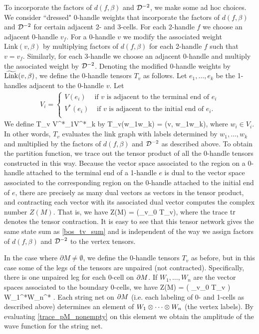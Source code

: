 To incorporate the factors of $d(f, \beta)$ and $\mathcal{D}^{-2}$, we make some ad hoc choices.
We consider ``dressed" 
0-handle weights that incorporate the factors of $d(f,\beta)$ and $\mathcal{D}^{-2}$ for certain adjacent 2- and 3-cells.
For each 2-handle $f$ we choose an adjacent 0-handle $v_f$.
For a 0-handle $v$ we modify the associated weight ${\text{Link}}(v,\beta)$ by multiplying factors of $d(f,\beta)$ for each 2-handle $f$ such that $v = v_f$.
Similarly, for each 3-handle we choose an adjacent 0-handle and multiply the associated weight by $\mathcal{D}^{-2}$.
Denoting the modified 0-handle weights by $\widetilde{\rm Link}(v,\beta)$, 
we define the 0-handle tensors $T_v$ as follows.
Let $e_1, \ldots, e_k$ be the 1-handles adjacent to the 0-handle $v$.
Let 
\begin{align}
\label{0_handleVectorspaces}
V_i = \begin{cases}
V(e_i) & \text{if $v$ is adjacent to the terminal end of $e_i$}\\
V^*(e_i) & \text{ if $v$ is adjacent to the initial end of $e_i$}.\\
\end{cases}
\end{align}
We define
\be
	T_v \in V^*_1\tp\cdots\tp V^*_k
\ee
by
\be
\label{vertex_tensor}
	T_v(w_1\tp\cdots\tp w_k) = (v, w_1\tp\cdots\tp w_k),
\ee
where $w_i\in V_i$.
In other words, $T_v$ evaluates the link graph with labels determined by $w_1,\ldots,w_k$ and multiplied by the factors of $d(f,\beta)$ and $\mathcal{D}^{-2}$ as described above.
To obtain the partition function, we trace out the tensor product of all the 0-handle tensors constructed in this way.
Because the vector space associated to the region on a $0$-handle attached to the 
terminal end of a 1-handle $e$ is dual to the vector space associated to the corresponding region on the 
0-handle attached to the initial end of $e$, there are precisely as many dual vectors as vectors in the tensor product, and 
contracting each vector with its associated dual vector computes the complex number $Z(M)$. 
That is, we have 
\be Z(M) = \tr \left(\bigotimes_{v\in \mch_0} T_v\right),\ee
where the trace $\text{tr}$ denotes the tensor contraction.
It is easy to see that this tensor network gives the same state sum as \eqref{bos_tv_sum} and 
is independent of the way we assign factors of $d(f,\beta)$ and $\mathcal{D}^{-2}$ to the 
vertex tensors. 

\medskip

In the case where $\partial M \neq \emptyset$, we define the 0-handle tensors $T_v$ as before,
but in this case some of the legs of the tensors are unpaired (not contracted).
Specifically, there is one unpaired leg for each 0-cell on $\partial M$.
If $W_1, \ldots, W_n$ are the vector spaces associated to the boundary 0-cells, we have
\be \label{trace_pM_nonempty}
	Z(M) = \tr \left( \bigotimes_{v\in \mch_0} T_v \right) \in W_1^*\tp\cdots\tp W_n^* .
\ee
Each string net on $\partial M$ (i.e. each labeling of 0- and 1-cells as described above)
determines an element of $W_1\otimes\cdots\otimes W_n$ (the vertex labels).
By evaluating \eqref{trace_pM_nonempty} on this element we obtain the amplitude of the wave function for the string net.


